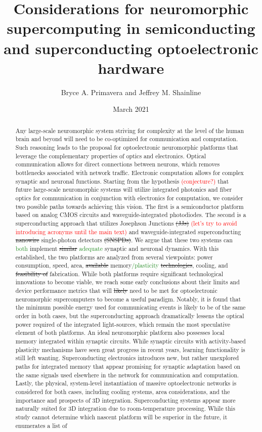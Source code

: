\documentclass[twocolumn]{article}
\title{\textcolor{OliveGreen}{Considerations for neuromorphic supercomputing in semiconducting and superconducting optoelectronic hardware}}
\author{Bryce A. Primavera and Jeffrey M. Shainline}
\date{March 2021}
\begin{document}
\maketitle
\begin{abstract}
Any large-scale neuromorphic system striving for complexity at the level of the human brain and beyond will need to be co-optimized for communication and computation. Such reasoning leads to the proposal for optoelectronic neuromorphic platforms that leverage the complementary properties of optics and electronics. Optical communication allows for direct connections between neurons, which removes bottlenecks associated with network traffic. Electronic computation allows for complex synaptic and neuronal functions. Starting from the hypothesis \textcolor{red}{(conjecture?)} that future large-scale neuromorphic systems will utilize integrated photonics and fiber optics for communication in conjunction with electronics for computation, we consider two possible paths towards achieving this vision. The first is a semiconductor platform based on analog CMOS circuits and waveguide-integrated photodiodes. The second is a superconducting approach that utilizes Josephson Junctions \sout{(JJs)} \textcolor{red}{(let's try to avoid introducing acronyms until the main text)} and waveguide-integrated superconducting \sout{nanowire} single-photon detectors \sout{(SNSPDs)}. We argue that these two systems can \textcolor{ForestGreen}{both} implement \sout{similar} \textcolor{ForestGreen}{adequate} synaptic and neuronal dynamics. With this established, the two platforms are analyzed from several viewpoints: power consumption, speed, area, \sout{available} memory\textcolor{ForestGreen}{/plasticity} \sout{technologies}, cooling, and \sout{feasibility of} fabrication. While both platforms require significant technological innovations to become viable, we reach some early conclusions about their limits and device performance metrics that will \sout{likely} need to be met for optoelectronic neuromorphic supercomputers to become a useful paradigm. Notably, it is found that the minimum possible energy used for communicating events is likely to be of the same order in both cases, but the superconducting approach dramatically lessens the optical power required of the integrated light-sources, which remain the most speculative element of both platforms. An ideal neuromorphic platform also possesses local memory integrated within synaptic circuits. While synaptic circuits with activity-based plasticity mechanisms have seen great progress in recent years, learning functionality is still left wanting. Superconducting electronics introduces new, but rather unexplored paths for integrated memory that appear promising for synaptic adaptation based on the same signals used elsewhere in the network for communication and computation. Lastly, the physical, system-level instantiation of massive optoelectronic networks is considered for both cases, including cooling systems, area considerations, and the importance and prospects of 3D integration. Superconducting systems appear more naturally suited for 3D integration due to room-temperature processing. While this study cannot determine which nascent platform will be superior in the future, it enumerates a list of 
\end{abstract}
\end{document}
